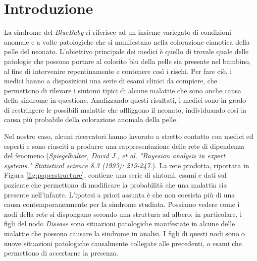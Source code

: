 \chapter{Introduzione}
La sindrome del \textit{BlueBaby} ri riferisce ad un insieme variegato di condizioni anomale e a volte patologiche che si manifestano nella colorazione cianotica della pelle del neonato.
L'obiettivo principale dei medici è quello di trovale quale delle patologie che possono portare al colorito blu della pelle sia presente nel bambino, al fine di intervenire repentinamente e contenere così i rischi. Per fare ciò, i medici hanno a disposizioni una serie di esami clinici da compiere, che permettono di rilevare i sintomi tipici di alcune malattie che sono anche causa della sindrome in questione. Analizzando questi risultati, i medici sono in grado di restringere le possibili malattie che affliggono il neonato, individuando così la causa più probabile della colorazione anomala della pelle.

Nel nostro caso, alcuni ricercatori hanno lavorato a stretto contatto con medici ed esperti e sono riusciti a produrre una rappresentazione delle rete di dipendenza del fenomeno (\textit{Spiegelhalter, David J., et al. "Bayesian analysis in expert systems." Statistical science 8.3 (1993): 219-247.}). La rete prodotta, riportata in Figura \ref{fig:paperstructure}, contiene una serie di sintomi, esami e dati sul paziente che permettono di modificare la probabilità che una malattia sia presente nell'infante. L'ipotesi a priori assunta è che non coesista più di una causa contemporaneamente per la sindrome studiata. Possiamo vedere come i nodi della rete si dispongano secondo una struttura ad albero; in particolare, i figli del nodo \textit{Disease} sono situazioni patologiche manifestate in alcune delle malattie che possono causare la sindrome in analisi. I figli di questi nodi sono o nuove situazioni patologiche causalmente collegate alle precedenti, o esami che permettono di accertarne la presenza.
 
